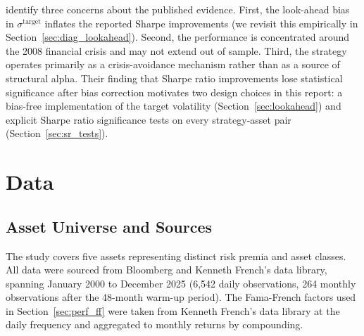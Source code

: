 \documentclass[12pt, a4paper]{article}
\newcommand{\stgt}{\sigma^{\mathrm{target}}}
\begin{document}
\citet{Liu2019} identify three concerns about the published evidence. First, the
look-ahead bias in $\stgt$ inflates the reported Sharpe improvements (we revisit this
empirically in Section~\ref{sec:diag_lookahead}). Second, the performance is concentrated
around the 2008 financial crisis and may not extend out of sample. Third, the strategy
operates primarily as a crisis-avoidance mechanism rather than as a source of structural
alpha. Their finding that Sharpe ratio improvements lose statistical significance after
bias correction motivates two design choices in this report: a bias-free implementation
of the target volatility (Section~\ref{sec:lookahead}) and explicit Sharpe ratio
significance tests on every strategy-asset pair (Section~\ref{sec:sr_tests}).


\section{Data}
\label{sec:data}

\subsection{Asset Universe and Sources}

The study covers five assets representing distinct risk premia and asset classes. All data
were sourced from Bloomberg and Kenneth French's data library, spanning January 2000 to
December 2025 (6,542 daily observations, 264 monthly observations after the 48-month
warm-up period). The Fama-French factors used in Section~\ref{sec:perf_ff} were taken from
Kenneth French's data library at the daily frequency and aggregated to monthly returns by
compounding.
\end{document}
